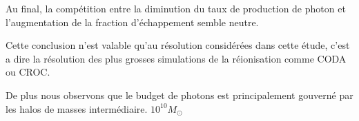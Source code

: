 Au final, la compétition entre la diminution du taux de production de photon et l'augmentation de la fraction d'échappement semble neutre.

Cette conclusion n'est valable qu'au résolution considérées dans cette étude, c'est a dire la résolution des plus grosses simulations de la réionisation comme CODA ou CROC. %

De plus nous observons que le budget de photons est principalement gouverné par les halos de masses intermédiaire. $10^{10} M_\odot$







